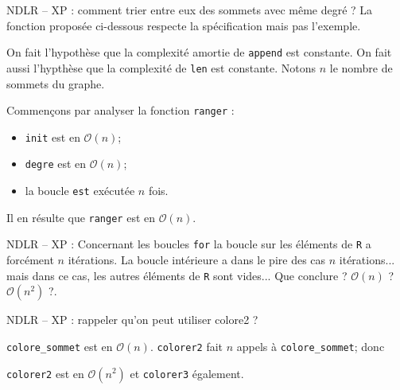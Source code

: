 \ifprof
\begin{corrige}
NDLR -- XP : comment trier entre eux des sommets avec même degré ?
La fonction proposée ci-dessous respecte la spécification mais pas l'exemple. 


\end{corrige}
\else
\fi

\ifprof
\begin{corrige}
On fait l'hypothèse que la complexité amortie de \lstinline{append} est constante.
On fait aussi l'hypthèse que la complexité de \lstinline{len} est constante.
Notons $n$ le nombre de sommets du graphe. 

Commençons par analyser la fonction \lstinline{ranger} :
\begin{itemize}
\item \lstinline{init} est en $\mathcal{O}(n)$;
\item \lstinline{degre} est en $\mathcal{O}(n)$;
\item la boucle \lstinline{est} exécutée $n$ fois.
\end{itemize}
Il en résulte que \lstinline{ranger} est en $\mathcal{O}(n)$.

NDLR -- XP :
Concernant les boucles \lstinline{for} la boucle sur les éléments de \lstinline{R} a forcément $n$ itérations. La boucle intérieure a dans le pire des cas $n$ itérations... mais dans ce cas, les autres éléments de \lstinline{R} sont vides... 
Que conclure ?  $\mathcal{O}(n)$ ? $\mathcal{O}(n^2)$ ?.
\end{corrige}
\else
\fi


\ifprof
\begin{corrige}
NDLR -- XP : rappeler qu'on peut utiliser colore2 ?


\lstinline{colore_sommet} est en $\mathcal{O}(n)$. \lstinline{colorer2} fait $n$ appels à \lstinline{colore_sommet}; donc 

\lstinline{colorer2} est en $\mathcal{O}(n^2)$ et \lstinline{colorer3} également. 
\end{corrige}
\else
\fi



